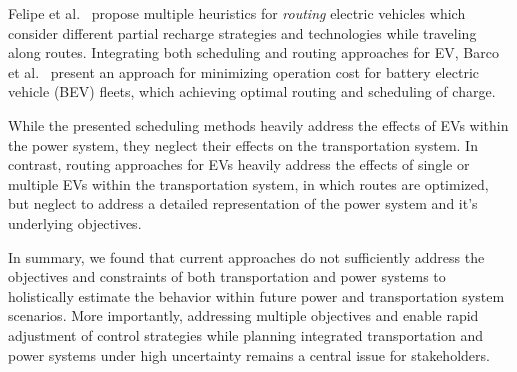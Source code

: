 Felipe et al.~\cite{felipe2014heuristic} propose multiple heuristics for \textit{routing} electric vehicles which consider different partial recharge strategies and technologies while traveling along routes. 
Integrating both scheduling and routing approaches for EV, Barco et al.~\cite{barco2013optimal} present an approach for minimizing operation cost for battery electric vehicle (BEV) fleets, which achieving optimal routing and scheduling of charge.


While the presented scheduling methods heavily address the effects of EVs within the power system, they neglect their effects on the transportation system. In contrast, routing approaches for EVs heavily address the effects of single or multiple EVs within the transportation system, in which routes are optimized, but neglect to address a detailed representation of the power system and it's underlying objectives. 


In summary, we found that current approaches do not sufficiently address the objectives and constraints of both transportation and power systems to holistically estimate the behavior within future power and transportation system scenarios. 
More importantly, addressing multiple objectives and enable rapid adjustment of control strategies while planning integrated transportation and power systems under high uncertainty remains a central issue for stakeholders. 

